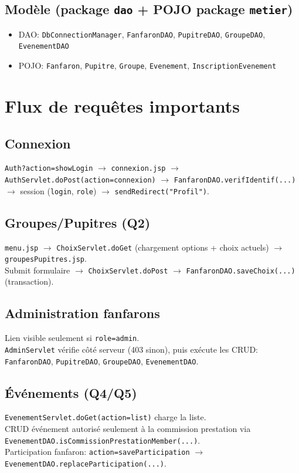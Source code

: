 ﻿\documentclass[11pt,a4paper]{article}
\begin{document}
\subsection*{Modèle (package \texttt{dao} + POJO package \texttt{metier})}
\begin{itemize}
  \item DAO: \texttt{DbConnectionManager}, \texttt{FanfaronDAO}, \texttt{PupitreDAO}, \texttt{GroupeDAO}, \texttt{EvenementDAO}
  \item POJO: \texttt{Fanfaron}, \texttt{Pupitre}, \texttt{Groupe}, \texttt{Evenement}, \texttt{InscriptionEvenement}
\end{itemize}

\section{Flux de requêtes importants}
\subsection*{Connexion}
\texttt{Auth?action=showLogin} $\rightarrow$ \texttt{connexion.jsp} $\rightarrow$ \texttt{AuthServlet.doPost(action=connexion)} $\rightarrow$ \texttt{FanfaronDAO.verifIdentif(...)} $\rightarrow$ session (\texttt{login}, \texttt{role}) $\rightarrow$ \texttt{sendRedirect("Profil")}.

\subsection*{Groupes/Pupitres (Q2)}
\texttt{menu.jsp} $\rightarrow$ \texttt{ChoixServlet.doGet} (chargement options + choix actuels) $\rightarrow$ \texttt{groupesPupitres.jsp}.\\
Submit formulaire $\rightarrow$ \texttt{ChoixServlet.doPost} $\rightarrow$ \texttt{FanfaronDAO.saveChoix(...)} (transaction).

\subsection*{Administration fanfarons}
Lien visible seulement si \texttt{role=admin}.\\
\texttt{AdminServlet} vérifie côté serveur (403 sinon), puis exécute les CRUD:
\texttt{FanfaronDAO}, \texttt{PupitreDAO}, \texttt{GroupeDAO}, \texttt{EvenementDAO}.

\subsection*{Événements (Q4/Q5)}
\texttt{EvenementServlet.doGet(action=list)} charge la liste.\\
CRUD événement autorisé seulement à la commission prestation via \texttt{EvenementDAO.isCommissionPrestationMember(...)}.\\
Participation fanfaron: \texttt{action=saveParticipation} $\rightarrow$ \texttt{EvenementDAO.replaceParticipation(...)}.
\end{document}
